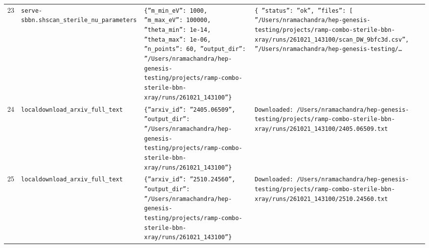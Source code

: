 \documentclass[11pt,a4paper]{article}
\begin{document}
\begin{longtable}{@{}p{}p{}p{}p{}@{}}
23 & \texttt{serve-sbbn.sh}\newline\texttt{scan\_\allowbreak{}sterile\_\allowbreak{}nu\_\allowbreak{}parameters} & \texttt{\{''m\_\allowbreak{}min\_\allowbreak{}eV'':\allowbreak{} 1000,\allowbreak{} ''m\_\allowbreak{}max\_\allowbreak{}eV'':\allowbreak{} 100000,\allowbreak{} ''theta\_\allowbreak{}min'':\allowbreak{} 1e-14,\allowbreak{} ''theta\_\allowbreak{}max'':\allowbreak{} 1e-06,\allowbreak{} ''n\_\allowbreak{}points'':\allowbreak{} 60,\allowbreak{} ''output\_\allowbreak{}dir'':\allowbreak{} ''/\allowbreak{}Users/\allowbreak{}nramachandra/\allowbreak{}hep-genesis-testing/\allowbreak{}projects/\allowbreak{}ramp-combo-sterile-bbn-xray/\allowbreak{}runs/\allowbreak{}261021\_\allowbreak{}143100''\}\allowbreak{}} & \texttt{\{   ''status'':\allowbreak{} ''ok'',\allowbreak{}   ''files'':\allowbreak{} [     ''/\allowbreak{}Users/\allowbreak{}nramachandra/\allowbreak{}hep-genesis-testing/\allowbreak{}projects/\allowbreak{}ramp-combo-sterile-bbn-xray/\allowbreak{}runs/\allowbreak{}261021\_\allowbreak{}143100/\allowbreak{}scan\_\allowbreak{}DW\_\allowbreak{}9bfc3d.csv'',\allowbreak{}     ''/\allowbreak{}Users/\allowbreak{}nramachandra/\allowbreak{}hep-genesis-testing/\allowbreak{}\ldots{}\allowbreak{}} \\
24 & \texttt{local}\newline\texttt{download\_\allowbreak{}arxiv\_\allowbreak{}full\_\allowbreak{}text} & \texttt{\{''arxiv\_\allowbreak{}id'':\allowbreak{} ''2405.06509'',\allowbreak{} ''output\_\allowbreak{}dir'':\allowbreak{} ''/\allowbreak{}Users/\allowbreak{}nramachandra/\allowbreak{}hep-genesis-testing/\allowbreak{}projects/\allowbreak{}ramp-combo-sterile-bbn-xray/\allowbreak{}runs/\allowbreak{}261021\_\allowbreak{}143100''\}\allowbreak{}} & \texttt{Downloaded:\allowbreak{} /\allowbreak{}Users/\allowbreak{}nramachandra/\allowbreak{}hep-genesis-testing/\allowbreak{}projects/\allowbreak{}ramp-combo-sterile-bbn-xray/\allowbreak{}runs/\allowbreak{}261021\_\allowbreak{}143100/\allowbreak{}2405.06509.txt} \\
25 & \texttt{local}\newline\texttt{download\_\allowbreak{}arxiv\_\allowbreak{}full\_\allowbreak{}text} & \texttt{\{''arxiv\_\allowbreak{}id'':\allowbreak{} ''2510.24560'',\allowbreak{} ''output\_\allowbreak{}dir'':\allowbreak{} ''/\allowbreak{}Users/\allowbreak{}nramachandra/\allowbreak{}hep-genesis-testing/\allowbreak{}projects/\allowbreak{}ramp-combo-sterile-bbn-xray/\allowbreak{}runs/\allowbreak{}261021\_\allowbreak{}143100''\}\allowbreak{}} & \texttt{Downloaded:\allowbreak{} /\allowbreak{}Users/\allowbreak{}nramachandra/\allowbreak{}hep-genesis-testing/\allowbreak{}projects/\allowbreak{}ramp-combo-sterile-bbn-xray/\allowbreak{}runs/\allowbreak{}261021\_\allowbreak{}143100/\allowbreak{}2510.24560.txt} \\

\end{longtable}
\end{document}
